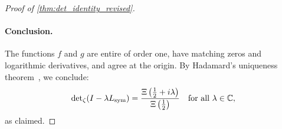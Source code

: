 \begin{proof}[Proof of \cref{thm:det_identity_revised}]
\paragraph{Conclusion.}
The functions \( f \) and \( g \) are entire of order one, have matching zeros and logarithmic derivatives, and agree at the origin. By Hadamard’s uniqueness theorem~\cite[Ch.~3]{Levin1996EntireLectures}, we conclude:
\[
\det\nolimits_{\zeta}(I - \lambda L_{\mathrm{sym}}) = \frac{\Xi\left( \tfrac{1}{2} + i\lambda \right)}{\Xi\left( \tfrac{1}{2} \right)}
\quad \text{for all } \lambda \in \mathbb{C},
\]
as claimed.
\end{proof}
